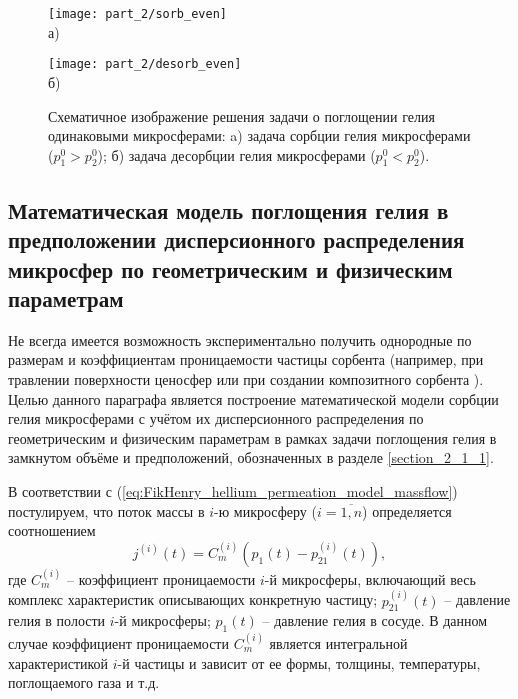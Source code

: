 \begin{figure}[ht] 
	\begin{minipage}[ht]{0.49\linewidth}\centering
			\texttt{[image: part\_2/sorb\_even]} \\ а)
	\end{minipage}
	\hfill
	\begin{minipage}[ht]{0.49\linewidth}\centering
		\texttt{[image: part\_2/desorb\_even]} \\ б)
	\end{minipage}

	\caption{Схематичное изображение решения задачи о поглощении гелия одинаковыми микросферами: a) задача сорбции гелия микросферами ($p_1^0>p_2^0$); б) задача десорбции гелия микросферами ($p_1^0<p_2^0$).}
	\label{pic:permeation_even}
\end{figure}




\subsection{Математическая модель поглощения гелия в предположении дисперсионного распределения микросфер по геометрическим и физическим параметрам}

Не всегда имеется возможность экспериментально получить однородные по размерам и коэффициентам проницаемости частицы сорбента  (например, при травлении поверхности ценосфер \cite{ICCT_cenosphere_permeation} или при создании композитного сорбента \cite{Vereshchagin:2016_Vapour_Helium}). Целью данного параграфа является построение математической модели сорбции гелия микросферами с учётом их дисперсионного распределения по геометрическим и физическим параметрам в рамках задачи поглощения гелия в замкнутом объёме и предположений, обозначенных в разделе \ref{section_2_1_1}.

В соответствии с (\ref{eq:FikHenry_hellium_permeation_model_massflow}) постулируем, что поток массы в $i$-ю микросферу ($i=\overline{1,n}$) определяется соотношением
\begin{equation}
\label{eq:uneven_p1_permeation_law}	
j^{(i)}(t) = C_m^{(i)}(p_1(t)-p_{21}^{(i)}(t)),
\end{equation}
где $C_m^{(i)}$	-- коэффициент проницаемости $i$-й микросферы, включающий весь комплекс характеристик описывающих конкретную частицу;
$p_{21}^{(i)}(t)$ -- давление гелия в полости $i$-й микросферы;
$p_1(t)$ -- давление гелия в сосуде. В данном случае коэффициент проницаемости $C_m^{(i)}$ является интегральной характеристикой $i$-й частицы и зависит от ее формы, толщины, температуры, поглощаемого газа и т.д.

